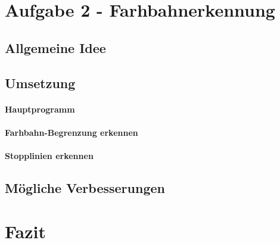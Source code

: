 \documentclass[a4paper,DIV=calc,ngerman]{scrartcl}
\begin{document}
\section{Aufgabe 2 - Farhbahnerkennung}
\label{sec:aufgabe2}



\subsection{Allgemeine Idee}
\label{sec:a2idee}



\subsection{Umsetzung}
\label{sec:a2umsetzung}

\paragraph{Hauptprogramm}

\paragraph{Farhbahn-Begrenzung erkennen}

\paragraph{Stopplinien erkennen}


\subsection{Mögliche Verbesserungen}
\label{sec:a2verbesserungen}



\section{Fazit}
\label{sec:Fazit}
\end{document}
